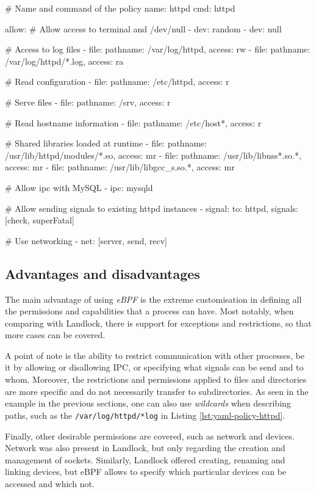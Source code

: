 \begin{code}[language=yaml, caption=A policy for HTTPD., label=lst:yaml-policy-httpd]
# Name and command of the policy
name: httpd
cmd: httpd

allow:
  # Allow access to terminal and /dev/null
  - dev: random
  - dev: null

  # Access to log files
  - file: {pathname: /var/log/httpd, access: rw}
  - file: {pathname: /var/log/httpd/*.log, access: ra}

  # Read configuration
  - file: {pathname: /etc/httpd, access: r}

  # Serve files
  - file: {pathname: /srv, access: r}

  # Read hostname information
  - file: {pathname: /etc/host*, access: r}

  # Shared libraries loaded at runtime
  - file: {pathname: /usr/lib/httpd/modules/*.so,
           access: mr}
  - file: {pathname: /usr/lib/libnss*.so.*, access: mr}
  - file: {pathname: /usr/lib/libgcc_s.so.*, access: mr}

  # Allow ipc with MySQL
  - ipc: mysqld

  # Allow sending signals to existing httpd instances
  - signal: {to: httpd, signals: [check, superFatal]}

  # Use networking
  - net: [server, send, recv]
\end{code}

\subsection{Advantages and disadvantages}

The main advantage of using \textit{eBPF} is the extreme customisation in defining all the
permissions and capabilities that a process can have. Most notably, when comparing with Landlock,
there is support for exceptions and restrictions, so that more cases can be covered.

A point of note is the ability to restrict communication with other processes, be it by allowing
or disallowing IPC, or specifying what signals can be send and to whom.
Moreover, the restrictions and permissions applied to files and directories are more specific and do not
necessarily transfer to subdirectories. As seen in the example in the previous sections,
one can also use \textit{wildcards} when describing paths, such as the \texttt{/var/log/httpd/*log}
in Listing \ref{lst:yaml-policy-httpd}.

Finally, other desirable permissions are covered, such as network and devices. Network was also present
in Landlock, but only regarding the creation and management of sockets. Similarly, Landlock offered
creating, renaming and linking devices, but eBPF allows to specify which particular devices can be accessed
and which not.

